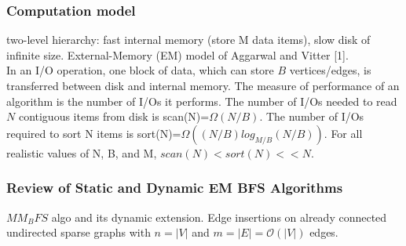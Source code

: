 \documentclass[12pt,a4paper,titlepage,xcolor=dvipsnames]{article}
\begin{document}
\subsubsection{Computation model}
two-level hierarchy: fast internal memory (store M data items), slow disk of infinite size.
External-Memory (EM) model of Aggarwal and Vitter [1].\\
In an I/O operation, one block of data, which can store $B$ vertices/edges, is transferred between disk and internal memory. The measure of performance of an algorithm is the number of I/Os it performs. The number of I/Os needed to read $N$ contiguous items from disk is scan(N)=$\Omega(N/B)$. The number of I/Os required to sort N items is sort(N)=$\Omega((N/B)log_{M/B}(N/B))$. For all realistic values of N, B, and M, $scan(N)<sort(N)<<N$.
\subsubsection{Review of Static and Dynamic EM BFS Algorithms}
$MM_BFS$ algo and its dynamic extension. Edge insertions on already connected undirected sparse graphs with $n=|V|$ and $m=|E|=\mathcal{O}(|V|)$ edges.
\end{document}
